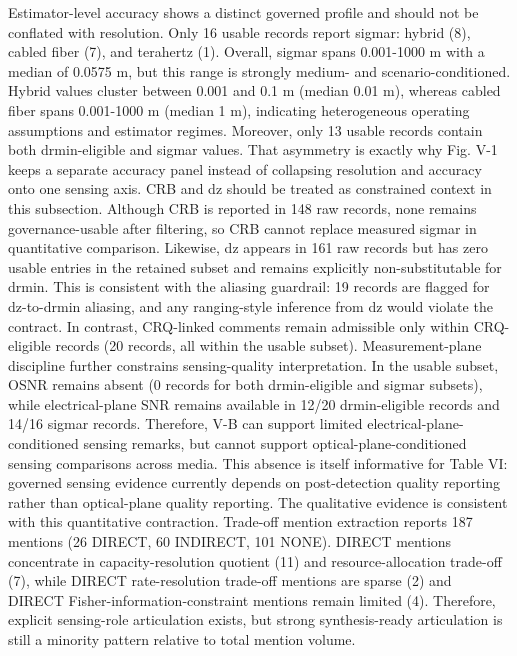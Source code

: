 {}Estimator-level accuracy shows a distinct governed profile and should not be conflated with resolution. Only 16 usable records report sigma\markdownRendererUnderscore{}r: hybrid (8), cabled fiber (7), and terahertz (1). Overall, sigma\markdownRendererUnderscore{}r spans 0.001-1000 m with a median of 0.0575 m, but this range is strongly medium- and scenario-conditioned. Hybrid values cluster between 0.001 and 0.1 m (median 0.01 m), whereas cabled fiber spans 0.001-1000 m (median 1 m), indicating heterogeneous operating assumptions and estimator regimes. Moreover, only 13 usable records contain both drmin-eligible and sigma\markdownRendererUnderscore{}r values. That asymmetry is exactly why Fig. V-1 keeps a separate accuracy panel instead of collapsing resolution and accuracy onto one sensing axis.\markdownRendererParagraphSeparator
{}CRB and dz should be treated as constrained context in this subsection. Although CRB is reported in 148 raw records, none remains governance-usable after filtering, so CRB cannot replace measured sigma\markdownRendererUnderscore{}r in quantitative comparison. Likewise, dz appears in 161 raw records but has zero usable entries in the retained subset and remains explicitly non-substitutable for drmin. This is consistent with the aliasing guardrail: 19 records are flagged for dz-to-drmin aliasing, and any ranging-style inference from dz would violate the contract. In contrast, CRQ-linked comments remain admissible only within CRQ-eligible records (20 records, all within the usable subset).\markdownRendererParagraphSeparator
{}Measurement-plane discipline further constrains sensing-quality interpretation. In the usable subset, OSNR remains absent (0 records for both drmin-eligible and sigma\markdownRendererUnderscore{}r subsets), while electrical-plane SNR remains available in 12/20 drmin-eligible records and 14/16 sigma\markdownRendererUnderscore{}r records. Therefore, V-B can support limited electrical-plane-conditioned sensing remarks, but cannot support optical-plane-conditioned sensing comparisons across media. This absence is itself informative for Table VI: governed sensing evidence currently depends on post-detection quality reporting rather than optical-plane quality reporting.\markdownRendererParagraphSeparator
{}The qualitative evidence is consistent with this quantitative contraction. Trade-off mention extraction reports 187 mentions (26 DIRECT, 60 INDIRECT, 101 NONE). DIRECT mentions concentrate in capacity-resolution quotient (11) and resource-allocation trade-off (7), while DIRECT rate-resolution trade-off mentions are sparse (2) and DIRECT Fisher-information-constraint mentions remain limited (4). Therefore, explicit sensing-role articulation exists, but strong synthesis-ready articulation is still a minority pattern relative to total mention volume.\markdownRendererParagraphSeparator
